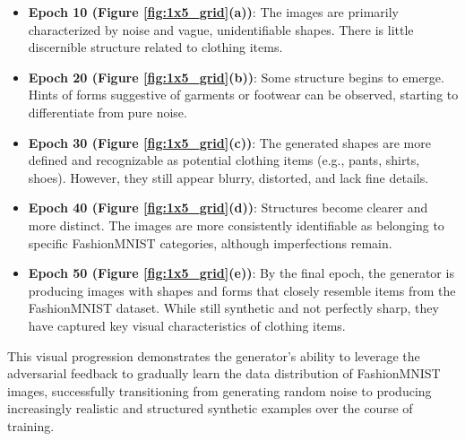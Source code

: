 \documentclass{article}
\begin{document}
\begin{itemize}
    \item \textbf{Epoch 10 (Figure \ref{fig:1x5_grid}(a))}: The images are primarily characterized by noise and vague, unidentifiable shapes. There is little discernible structure related to clothing items.
    \item \textbf{Epoch 20 (Figure \ref{fig:1x5_grid}(b))}: Some structure begins to emerge. Hints of forms suggestive of garments or footwear can be observed, starting to differentiate from pure noise.
    \item \textbf{Epoch 30 (Figure \ref{fig:1x5_grid}(c))}: The generated shapes are more defined and recognizable as potential clothing items (e.g., pants, shirts, shoes). However, they still appear blurry, distorted, and lack fine details.
    \item \textbf{Epoch 40 (Figure \ref{fig:1x5_grid}(d))}: Structures become clearer and more distinct. The images are more consistently identifiable as belonging to specific FashionMNIST categories, although imperfections remain.
    \item \textbf{Epoch 50 (Figure \ref{fig:1x5_grid}(e))}: By the final epoch, the generator is producing images with shapes and forms that closely resemble items from the FashionMNIST dataset. While still synthetic and not perfectly sharp, they have captured key visual characteristics of clothing items.
\end{itemize}

This visual progression demonstrates the generator's ability to leverage the adversarial feedback to gradually learn the data distribution of FashionMNIST images, successfully transitioning from generating random noise to producing increasingly realistic and structured synthetic examples over the course of training.


\end{document}
